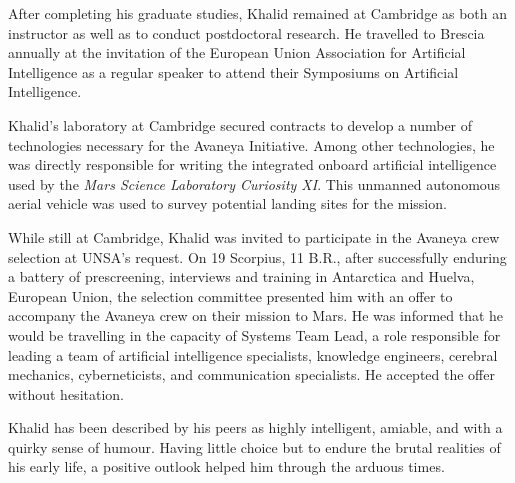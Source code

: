 After completing his graduate studies, Khalid remained at Cambridge as both an instructor as well as to conduct postdoctoral research. He travelled to Brescia annually at the invitation of the European Union Association for Artificial Intelligence as a regular speaker to attend their Symposiums on Artificial Intelligence.

Khalid's laboratory at Cambridge secured contracts to develop a number of technologies necessary for the Avaneya Initiative. Among other technologies, he was directly responsible for writing the integrated onboard artificial intelligence used by the {\it Mars Science Laboratory Curiosity XI}. This unmanned autonomous aerial vehicle was used to survey potential landing sites for the mission.

While still at Cambridge, Khalid was invited to participate in the Avaneya crew selection at UNSA's request. On 19 Scorpius, 11 B.R., after successfully enduring a battery of prescreening, interviews and training in Antarctica and Huelva, European Union, the selection committee presented him with an offer to accompany the Avaneya crew on their mission to Mars. He was informed that he would be travelling in the capacity of Systems Team Lead, a role responsible for leading a team of artificial intelligence specialists, knowledge engineers, cerebral mechanics, cyberneticists, and communication specialists. He accepted the offer without hesitation.

Khalid has been described by his peers as highly intelligent, amiable, and with a quirky sense of humour. Having little choice but to endure the brutal realities of his early life, a positive outlook helped him through the arduous times.

